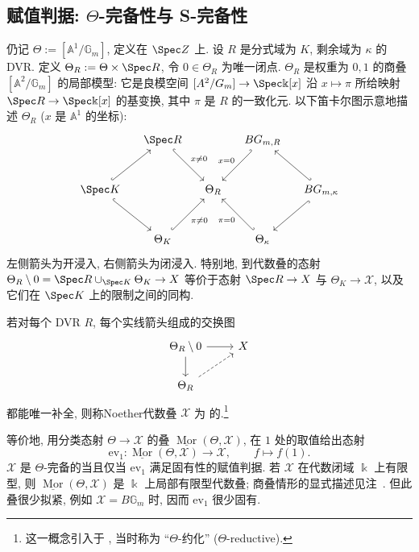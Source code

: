 \subsection{赋值判据: \texorpdfstring{$\Theta$}{Θ}-完备性与 S-完备性}\label{src:7.9.2-subsection}
仍记 $\Theta:=[\mathbb A^1/\mathbb G_m]$, 定义在 $\Spec\mathbb Z$ 上. 设 $R$ 是分式域为 $K$, 剩余域为 $\kappa$ 的 DVR. 定义 $\Theta_R:=\Theta\times\Spec R$, 令 $0\in\Theta_R$ 为唯一闭点. $\Theta_R$ 是权重为 $0,1$ 的商叠 $[\mathbb A^2/\mathbb G_m]$ 的局部模型: 它是良模空间 $[\mathbb A^2/\mathbb G_m]\to\Spec\Bbbk[x]$ 沿 $x\mapsto\pi$ 所给映射 $\Spec R\to\Spec\Bbbk[x]$ 的基变换, 其中 $\pi$ 是 $R$ 的一致化元. 以下笛卡尔图示意地描述 $\Theta_R$ ($x$ 是 $\mathbb A^1$ 的坐标):
\begin{align}\label{src:7.9.9}
\begin{tikzcd}[ampersand replacement=\&,column sep=small,row sep=large]
\&\Spec R\arrow[dr,hook,"{x\ne0}"]\&\&B\mathbb G_{m,R}\arrow[dl,hook',"{x=0}"']\&\\
\Spec K\arrow[ur,hook]\arrow[dr,hook]\& \&\Theta_R\&\&B\mathbb G_{m,\kappa}\arrow[ul,hook']\arrow[dl,hook]\\
\&\Theta_K\arrow[ur,hook,"{\pi\ne0}"']\&\&\Theta_\kappa\arrow[ul,hook',"{\pi=0}"]\&
\end{tikzcd}
\end{align}
左侧箭头为开浸入, 右侧箭头为闭浸入. 特别地, 到代数叠的态射 $\Theta_R\setminus0=\Spec R\cup_{\Spec K}\Theta_K\to\mathcal X$ 等价于态射 $\Spec R\to\mathcal X$ 与 $\Theta_K\to\mathcal X$, 以及它们在 $\Spec K$ 上的限制之间的同构.
\begin{definition}\label{src:7.9.10}
若对每个 DVR $R$, 每个实线箭头组成的交换图
\begin{align}\label{src:7.9.11}
\begin{tikzcd}[ampersand replacement=\&]\Theta_R\setminus0\arrow[r]\arrow[d]\&\mathcal X\\\Theta_R\arrow[ur,dashed]\&\end{tikzcd}
\end{align}
都能唯一补全, 则称Noether代数叠 $\mathcal X$ 为 的.\footnote{这一概念引入于 \cite{HL14}, 当时称为 ``$\Theta$-约化'' ($\Theta$-reductive).}
\end{definition}
\begin{remark}\label{src:7.9.12}
等价地, 用分类态射 $\Theta\to\mathcal X$ 的叠 $\underline{\operatorname{Mor}}(\Theta,\mathcal X)$, 在 $1$ 处的取值给出态射
\[\mathrm{ev}_1:\underline{\operatorname{Mor}}(\Theta,\mathcal X)\to\mathcal X,\qquad f\mapsto f(1).\]
$\mathcal X$ 是 $\Theta$-完备的当且仅当 $\mathrm{ev}_1$ 满足固有性的赋值判据. 若 $\mathcal X$ 在代数闭域 $\Bbbk$ 上有限型, 则 $\underline{\operatorname{Mor}}(\Theta,\mathcal X)$ 是 $\Bbbk$ 上局部有限型代数叠; 商叠情形的显式描述见注~. 但此叠很少拟紧, 例如 $\mathcal X=B\mathbb G_m$ 时, 因而 $\mathrm{ev}_1$ 很少固有.
\end{remark}
